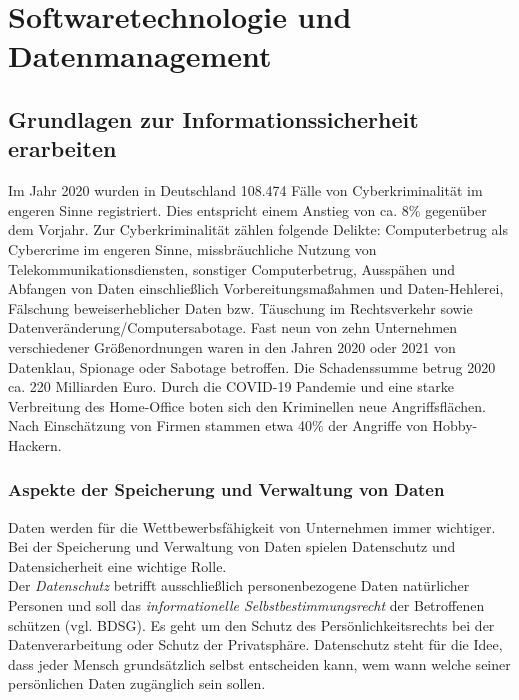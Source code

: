 \documentclass[a4paper, 12pt]{report}
\begin{document}
\chapter{Softwaretechnologie und Datenmanagement}
\begin{multicols}{2}

\section{Grundlagen zur Informationssicherheit erarbeiten} %

Im Jahr 2020 wurden in Deutschland 108.474 Fälle von Cyberkriminalität im 
engeren Sinne registriert. Dies entspricht einem Anstieg von ca. 8\% gegenüber 
dem Vorjahr. Zur Cyberkriminalität zählen folgende Delikte: Computerbetrug als 
Cybercrime im engeren Sinne, missbräuchliche Nutzung von 
Telekommunikationsdiensten, sonstiger Computerbetrug, Ausspähen und Abfangen von 
Daten einschließlich Vorbereitungsmaßahmen und Daten-Hehlerei, Fälschung 
beweiserheblicher Daten bzw. Täuschung im Rechtsverkehr sowie 
Datenveränderung/Computersabotage. Fast neun von zehn Unternehmen verschiedener 
Größenordnungen  waren in den Jahren 2020 oder 2021 von Datenklau, Spionage oder 
Sabotage betroffen. Die Schadenssumme betrug 2020 ca. 220 Milliarden Euro. Durch
die COVID-19 Pandemie und eine starke Verbreitung des Home-Office boten sich den 
Kriminellen neue Angriffsflächen. Nach Einschätzung von Firmen stammen etwa 40\%
der Angriffe von Hobby-Hackern. 

\subsection{Aspekte der Speicherung und Verwaltung von Daten}

Daten werden für die Wettbewerbsfähigkeit von Unternehmen immer wichtiger. Bei
der Speicherung und Verwaltung von Daten spielen Datenschutz und Datensicherheit 
eine wichtige Rolle. \\

Der \emph{Datenschutz} betrifft ausschließlich personenbezogene Daten 
natürlicher Personen und soll das \emph{informationelle Selbstbestimmungsrecht}
der Betroffenen schützen (vgl. BDSG). Es geht um den Schutz des 
Persönlichkeitsrechts bei der Datenverarbeitung oder Schutz der Privatsphäre. 
Datenschutz steht für die Idee, dass jeder Mensch grundsätzlich selbst 
entscheiden kann, wem wann welche seiner persönlichen Daten zugänglich sein 
sollen. \\


\end{multicols}
\end{document}
